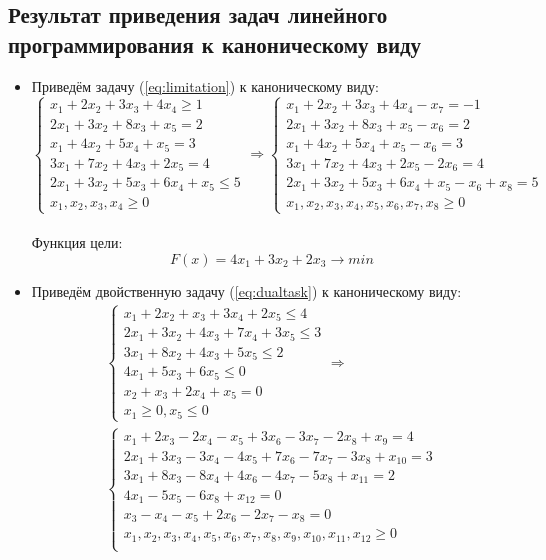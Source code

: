 \documentclass[../body.tex]{subfiles}
\begin{document}
	 \subsection{Результат приведения задач линейного программирования к каноническому виду}
	\begin{itemize}
		\item Приведём задачу (\ref{eq:limitation}) к каноническому виду:\\
	\begin{equation}
		\left\{
		\begin{array}{ll} 
			x_1+2x_2+3x_3+4x_4 \ge 1\\
			2x_1+3x_2+8x_3+x_5=2\\
			x_1+4x_2+5x_4+x_5=3\\
			3x_1+7x_2+4x_3+2x_5 = 4\\
			2x_1+3x_2+5x_3+6x_4+x_5 \le 5\\
			x_1,x_2,x_3,x_4 \ge 0
		\end{array}
		\right.
		\Longrightarrow
		\left\{
		\begin{array}{ll} 
			x_1+2x_2+3x_3+4x_4 -x_7 = -1\\
			2x_1+3x_2+8x_3+x_5-x_6=2\\
			x_1+4x_2+5x_4+x_5-x_6=3\\
			3x_1+7x_2+4x_3+2x_5-2x_6 = 4\\
			2x_1+3x_2+5x_3+6x_4+x_5-x_6 +x_8= 5\\
			x_1,x_2,x_3,x_4,x_5,x_6,x_7,x_8 \ge 0
		\end{array}
		\right.
	\end{equation}\\
	Функция цели:
	$$F(x) =  4x_1 + 3x_2 + 2x_3 \longrightarrow min $$
	
\item Приведём двойственную задачу (\ref{eq:dualtask}) к каноническому виду:
\begin{multline} 	
	\left\{
\begin{array}{ll} 
	x_1+2x_2+x_3+3x_4+2x_5\le 4\\
	2x_1+3x_2+4x_3+7x_4+3x_5 \le 3\\
	3x_1+8x_2+4x_3+5x_5 \le 2\\
	4x_1+5x_3+6x_5 \le 0\\
	x_2+x_3+2x_4+x_5 = 0\\
	x_1\ge 0, x_5 \le 0
\end{array}
	\right. 
	\Longrightarrow\\
	\left\{
	\begin{array}{ll} 
		x_1+2x_3-2x_4-x_5+3x_6-3x_7-2x_8+x_9= 4\\
		2x_1+3x_3-3x_4-4x_5+7x_6-7x_7-3x_8+x_{10}= 3\\
		3x_1+8x_3-8x_4+4x_6-4x_7-5x_8+x_{11}= 2\\
		4x_1-5x_5-6x_8+x_{12}= 0\\
		x_3-x_4-x_5+2x_6-2x_7-x_8= 0\\
		x_1,x_2,x_3,x_4,x_5,x_6,x_7,x_8,x_9,x_{10},x_{11},x_{12}\ge 0\\
	\end{array}
	\right.
\end{multline}


\end{itemize}
\end{document}
